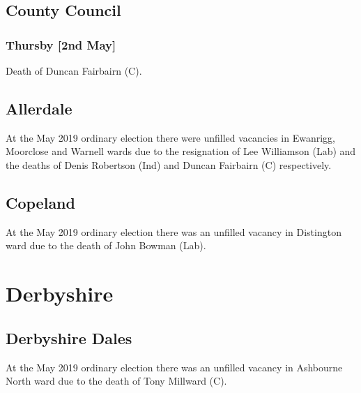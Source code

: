\documentclass[a4paper,openany]{book}
\begin{document}
\begin{resultsiii}
\subsection*{County Council}

\subsubsection*{Thursby \hspace*{\fill}\nolinebreak[1]%
	\enspace\hspace*{\fill}
	[2nd May]}


Death of Duncan Fairbairn (C).

\subsection*{Allerdale}

At the May 2019 ordinary election there were unfilled vacancies in Ewanrigg, Moorclose and Warnell wards due to the resignation of Lee Williamson (Lab) and the deaths of Denis Robertson (Ind) and Duncan Fairbairn (C) respectively.

\subsection*{Copeland}

At the May 2019 ordinary election there was an unfilled vacancy in Distington ward due to the death of John Bowman (Lab).

\section{Derbyshire}

\subsection*{Derbyshire Dales}

At the May 2019 ordinary election there was an unfilled vacancy in Ashbourne North ward due to the death of Tony Millward (C).


\end{resultsiii}
\end{document}
